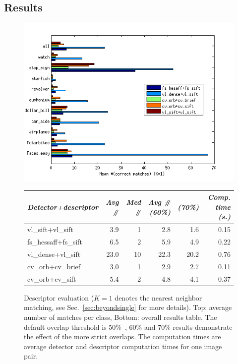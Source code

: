 \documentclass[review]{elsarticle}
\begin{document}
\subsection{Results\label{sec:results1}}
%
%
\begin{figure}[h]
\begin{center}
{\includegraphics[width=0.6\linewidth]{resources/antti_results/DescriptorResults/numOfAvgMatchMean.png}}\\
{%
{\small
\begin{tabular}{l r r r r r}
\toprule
\textit{Detector+descriptor} & \textit{Avg \#} & \textit{Med \#} & \textit{Avg \# (60\%)} & \textit{(70\%)} & \textit{Comp. time (s.)}\\
\midrule
{vl\_sift+vl\_sift}         &  3.9 &  1 &  2.8 &  1.6 & 0.15 \\ %
{fs\_hessaff+fs\_sift}      &  6.5 &  2 &  5.9 &  4.9 & 0.22 \\ %
{vl\_dense+vl\_sift}        & 23.0 & 10 & 22.3 & 20.2 & 0.76 \\ %
{cv\_orb+cv\_brief}         &  3.0 &  1 &  2.9 &  2.7 & 0.11 \\ %
{cv\_orb+cv\_sift}          &  5.4 &  2 &  4.8 &  4.1 & 0.37 \\ %
\bottomrule
\end{tabular}}
} %
\caption{Descriptor evaluation ($K=1$ denotes the nearest neighbor matching, see Sec.~\ref{sec:beyondsingle} for more details). Top: average number of matches per class,
Bottom: overall results table. The default overlap threshold is 50\%~\cite{MikSch:2005}, 
60\% and 70\% results demonstrate the effect of the more strict overlaps. The computation
times are average detector and descriptor computation times for one image pair.}
\label{fig:results2}
\end{center}
\end{figure}
\end{document}
